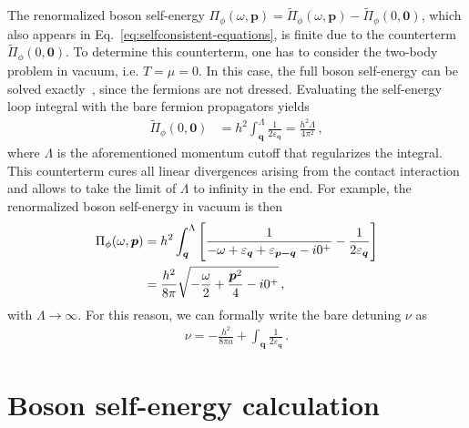 The renormalized boson self-energy $\Pi_{\phi}(\omega,\bm{p})=\tilde{\Pi}_{\phi}(\omega,\bm{p}) - \tilde{\Pi}_{\phi}(0,\bm{0})$, which also appears in Eq.~\eqref{eq:selfconsistent-equations}, is finite due to the counterterm $\tilde{\Pi}_{\phi}(0,\bm{0})$. To determine this counterterm, one has to consider the two-body problem in vacuum, i.e. $T=\mu=0$. In this case, the full boson self-energy can be solved exactly~\cite{Diehl2006-1,Schmidt2013}, since the fermions are not dressed. Evaluating the self-energy loop integral with the bare fermion propagators yields
%
\begin{align}
	\tilde{\Pi}_{\phi}(0,\bm{0}) &= h^2 \int_{\bm{q}}^{\Lambda} \frac{1}{2\varepsilon_{\bm{q}}} = \frac{h^2\Lambda}{4\pi^2} \,,
\end{align}
%
where $\Lambda$ is the aforementioned momentum cutoff that regularizes the integral. This counterterm cures all linear divergences arising from the contact interaction and allows to take the limit of $\Lambda$ to infinity in the end. For example, the renormalized boson self-energy in vacuum is then
%
\begin{align}
	\Pi_{\phi}(\omega, \bm{p}) &= h^2 \int_{\bm{q}}^{\Lambda} \left[\frac{1}{-\omega+\varepsilon_{\bm{q}}+\varepsilon_{\bm{p-q}}-i0^+} - \frac{1}{2\varepsilon_{\bm{q}}}\right] \notag \\
	&= \frac{h^2}{8\pi} \sqrt{-\frac{\omega}{2}+\frac{\bm{p}^2}{4}-i0^+}  \,,
\end{align}
%
with $\Lambda\rightarrow\infty$. For this reason, we can formally write the bare detuning $\nu$ as~\cite{Haussmann2009,Zwerger2016}
%
\begin{align}
	\label{eq:renorm-detuning}
	\nu = -\frac{h^2}{8\pi a} + \int_{\bm{q}} \frac{1}{2\varepsilon_{\bm{q}}} \,.
\end{align}



\clearpage

\section{Boson self-energy calculation}
\label{app:boson-self-energy-calculation}


